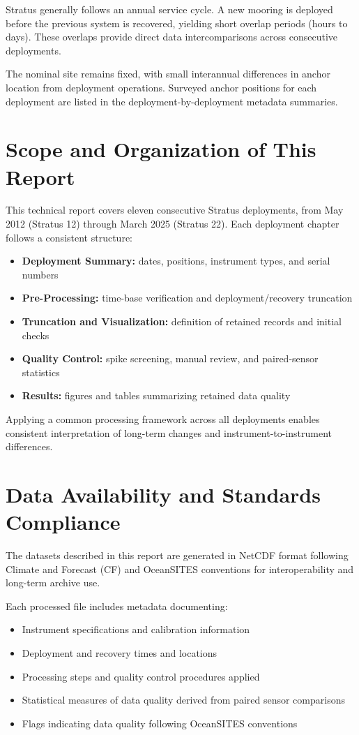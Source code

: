 Stratus generally follows an annual service cycle. A new mooring is deployed before the previous system is recovered, yielding short overlap periods (hours to days). These overlaps provide direct data intercomparisons across consecutive deployments.

The nominal site remains fixed, with small interannual differences in anchor location from deployment operations. Surveyed anchor positions for each deployment are listed in the deployment-by-deployment metadata summaries.

\section{Scope and Organization of This Report}

This technical report covers eleven consecutive Stratus deployments, from May 2012 (Stratus 12) through March 2025 (Stratus 22). Each deployment chapter follows a consistent structure:

\begin{itemize}
    \item \textbf{Deployment Summary:} dates, positions, instrument types, and serial numbers
    \item \textbf{Pre-Processing:} time-base verification and deployment/recovery truncation
    \item \textbf{Truncation and Visualization:} definition of retained records and initial checks
    \item \textbf{Quality Control:} spike screening, manual review, and paired-sensor statistics
    \item \textbf{Results:} figures and tables summarizing retained data quality
\end{itemize}

Applying a common processing framework across all deployments enables consistent interpretation of long-term changes and instrument-to-instrument differences.

\section{Data Availability and Standards Compliance}

The datasets described in this report are generated in NetCDF format following Climate and Forecast (CF) and OceanSITES conventions for interoperability and long-term archive use.

Each processed file includes metadata documenting:
\begin{itemize}
    \item Instrument specifications and calibration information
    \item Deployment and recovery times and locations
    \item Processing steps and quality control procedures applied
    \item Statistical measures of data quality derived from paired sensor comparisons
    \item Flags indicating data quality following OceanSITES conventions
\end{itemize}

